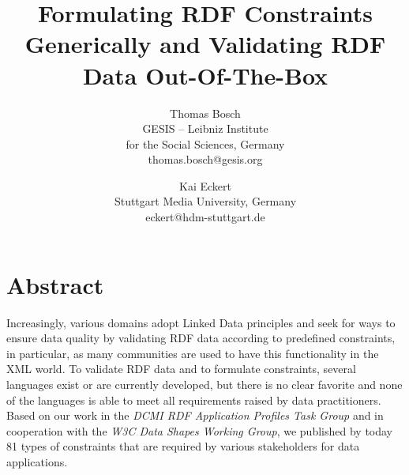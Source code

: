 \documentclass[a4paper,fontsize=11pt]{scrartcl}
\date{}
\newcommand{\tb}[1]{\todo[size=\small, color=green!40]{\textbf{Thomas:} #1}}
\newcommand{\ms}[1]{\texttt{#1}}
\begin{document}
\title{\vspace{-1em}Formulating RDF Constraints Generically and Validating RDF Data Out-Of-The-Box}

\author{Thomas Bosch\\GESIS – Leibniz Institute \\for the Social Sciences, Germany\\thomas.bosch@gesis.org \and Kai Eckert\\Stuttgart Media University, Germany\\eckert@hdm-stuttgart.de}

\maketitle
\vspace{-3em}
\section*{Abstract}
Increasingly, various domains adopt Linked Data principles
and seek for ways to ensure data quality by validating RDF data according to predefined constraints,
in particular, as many communities are used to have this functionality in the XML world.
To validate RDF data and to formulate constraints, several languages exist or are currently developed,
but there is no clear favorite and none of the languages is able to meet all requirements raised by data practitioners.
Based on our work in the \emph{DCMI RDF Application Profiles Task Group} and in cooperation with the \emph{W3C Data Shapes Working Group}, 
we published by today 81 types of constraints that are required by various stakeholders for data applications.
\end{document}

